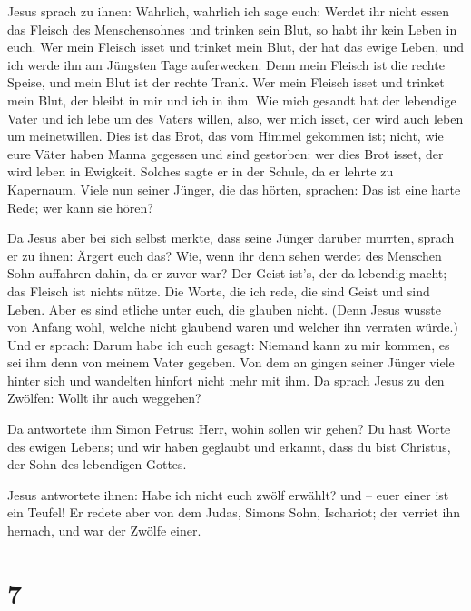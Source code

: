  Jesus sprach zu ihnen: Wahrlich, wahrlich ich sage euch:
Werdet ihr nicht essen das Fleisch des Menschensohnes und trinken sein
Blut, so habt ihr kein Leben in euch.  Wer mein Fleisch
isset und trinket mein Blut, der hat das ewige Leben, und ich werde ihn
am Jüngsten Tage auferwecken.  Denn mein Fleisch ist die
rechte Speise, und mein Blut ist der rechte Trank.  Wer
mein Fleisch isset und trinket mein Blut, der bleibt in mir und ich in
ihm.  Wie mich gesandt hat der lebendige Vater und ich
lebe um des Vaters willen, also, wer mich isset, der wird auch leben um
meinetwillen.  Dies ist das Brot, das vom Himmel gekommen
ist; nicht, wie eure Väter haben Manna gegessen und sind gestorben: wer
dies Brot isset, der wird leben in Ewigkeit.  Solches
sagte er in der Schule, da er lehrte zu Kapernaum.  Viele
nun seiner Jünger, die das hörten, sprachen: Das ist eine harte Rede;
wer kann sie hören?

 Da Jesus aber bei sich selbst merkte, dass seine Jünger
darüber murrten, sprach er zu ihnen: Ärgert euch das? 
Wie, wenn ihr denn sehen werdet des Menschen Sohn auffahren dahin, da er
zuvor war?  Der Geist ist's, der da lebendig macht; das
Fleisch ist nichts nütze. Die Worte, die ich rede, die sind Geist und
sind Leben.  Aber es sind etliche unter euch, die glauben
nicht. (Denn Jesus wusste von Anfang wohl, welche nicht glaubend waren
und welcher ihn verraten würde.)  Und er sprach: Darum
habe ich euch gesagt: Niemand kann zu mir kommen, es sei ihm denn von
meinem Vater gegeben.  Von dem an gingen seiner Jünger
viele hinter sich und wandelten hinfort nicht mehr mit ihm.
 Da sprach Jesus zu den Zwölfen: Wollt ihr auch weggehen?

 Da antwortete ihm Simon Petrus: Herr, wohin sollen wir
gehen? Du hast Worte des ewigen Lebens;  und wir haben
geglaubt und erkannt, dass du bist Christus, der Sohn des lebendigen
Gottes.

 Jesus antwortete ihnen: Habe ich nicht euch zwölf
erwählt? und -- euer einer ist ein Teufel!  Er redete
aber von dem Judas, Simons Sohn, Ischariot; der verriet ihn hernach, und
war der Zwölfe einer.

\hypertarget{section-6}{%
\section{7}\label{section-6}}

